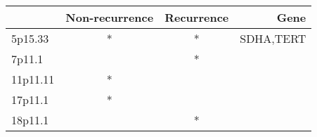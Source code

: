 \begin{tabular}{lccr}
\toprule
{} & Non-recurrence & Recurrence &       Gene \\
\midrule
5p15.33  &              * &          * &  SDHA,TERT \\
7p11.1   &                &          * &            \\
11p11.11 &              * &            &            \\
17p11.1  &              * &            &            \\
18p11.1  &                &          * &            \\
\bottomrule
\end{tabular}
